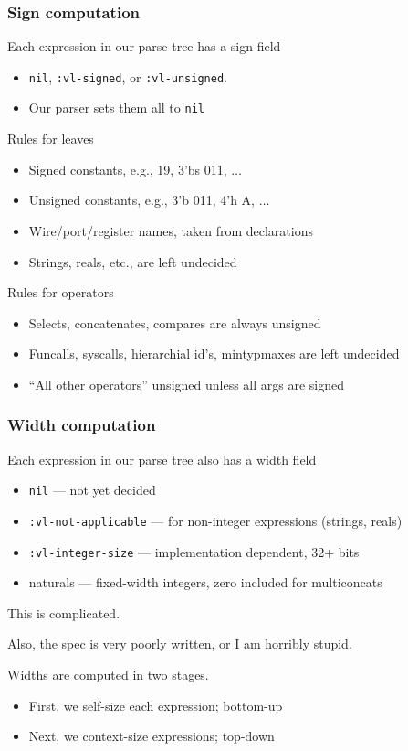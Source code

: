 \documentclass[mathserif]{beamer}
\newcommand{\Highlight}[1]{{\color{Highlight}#1}}
\begin{document}
\begin{frame}
\frametitle{Sign computation}

Each expression in our parse tree has a sign field
\begin{itemize}
\item {\tt nil}, {\tt :vl-signed}, or {\tt :vl-unsigned}.
\item Our parser sets them all to {\tt nil}
\end{itemize}

\bigskip
Rules for leaves
\begin{itemize}
\item Signed constants, e.g., 19, 3'bs 011, $\dots$
\item Unsigned constants, e.g., 3'b 011, 4'h A, $\dots$
\item Wire/port/register names, taken from declarations 
\item Strings, reals, etc., are left undecided
\end{itemize}

\bigskip
Rules for operators
\begin{itemize}
\item Selects, concatenates, compares are always unsigned
\item Funcalls, syscalls, hierarchial id's, mintypmaxes are left undecided
\item ``All other operators'' unsigned unless all args are signed
\end{itemize}

\end{frame}



\begin{frame}
\frametitle{Width computation}

Each expression in our parse tree also has a width field
\begin{itemize}
\item {\tt nil} --- not yet decided
\item {\tt :vl-not-applicable} --- for non-integer expressions (strings, reals)
\item {\tt :vl-integer-size} --- implementation dependent, 32+ bits
\item naturals --- fixed-width integers, zero included for multiconcats
\end{itemize}

\bigskip
This is complicated.

Also, the spec is very poorly written, or I am horribly stupid.

\bigskip
Widths are computed in two stages.
\begin{itemize}
\item First, we \Highlight{self-size} each expression; bottom-up
\item Next, we \Highlight{context-size} expressions; top-down
\end{itemize}

\end{frame}
\end{document}
